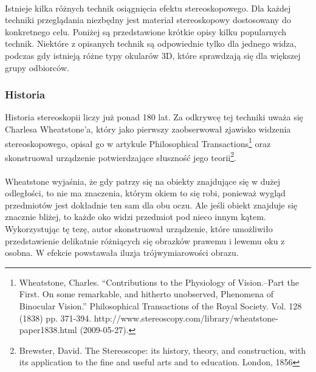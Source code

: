 \paragraph{} Istnieje kilka różnych technik osiągnięcia efektu stereoskopowego. Dla każdej techniki przeglądania niezbędny jest materiał stereoskopowy dostosowany do konkretnego celu. Poniżej są przedstawione krótkie opisy kilku popularnych technik. Niektóre z opisanych technik są odpowiednie tylko dla jednego widza, podczas gdy istnieją różne typy okularów 3D, które sprawdzają się dla większej grupy odbiorców.
\subsubsection{Historia} 
Historia stereoskopii liczy już ponad 180 lat. Za odkrywcę tej techniki uważa się Charlesa Wheatstone'a, który jako pierwszy zaobserwował zjawisko widzenia stereoskopowego, opisał go w artykule Philosophical Transactions\footnote{Wheatstone, Charles. “Contributions to the Physiology of Vision.–Part the First. On some remarkable, and hitherto unobserved, Phenomena of Binocular Vision.” Philosophical Transactions of the Royal Society. Vol. 128 (1838) pp. 371-394. http://www.stereoscopy.com/library/wheatstone-paper1838.html (2009-05-27).} oraz skonstruował urządzenie potwierdzające słuszność jego teorii\footnote{Brewster, David. The Stereoscope: its history, theory, and construction, with its application to the fine and useful arts and to education. London, 1856}. 
\paragraph{} Wheatstone wyjaśnia, że gdy patrzy się na obiekty znajdujące się w dużej odległości, to nie ma znaczenia, którym okiem to się robi, ponieważ wygląd przedmiotów jest dokładnie ten sam dla obu oczu. Ale jeśli obiekt znajduje się znacznie bliżej, to każde oko widzi przedmiot pod nieco innym kątem. Wykorzystując tę tezę, autor skonstruował urządzenie, które umożliwiło przedstawienie delikatnie różniących się obrazków prawemu i lewemu oku z osobna. W efekcie powstawała iluzja trójwymiarowości obrazu.
  
